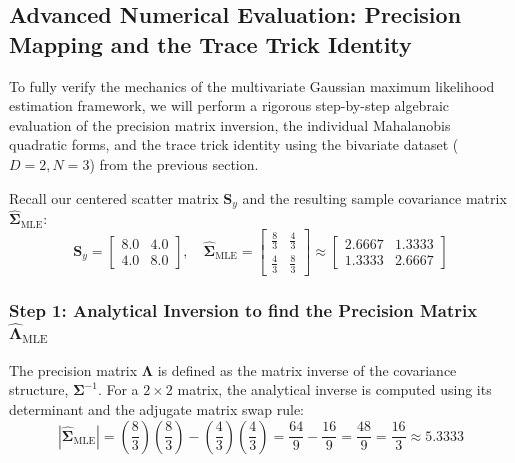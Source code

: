 \documentclass{article}
\begin{document}
\subsection{Advanced Numerical Evaluation: Precision Mapping and the Trace Trick Identity}

To fully verify the mechanics of the multivariate Gaussian maximum likelihood estimation framework, we will perform a rigorous step-by-step algebraic evaluation of the precision matrix inversion, the individual Mahalanobis quadratic forms, and the trace trick identity using the bivariate dataset ($D = 2, N = 3$) from the previous section.

Recall our centered scatter matrix $\mathbf{S}_y$ and the resulting sample covariance matrix $\hat{\boldsymbol{\Sigma}}_{\text{MLE}}$:
\begin{equation}
\mathbf{S}_y = \begin{bmatrix} 8.0 & 4.0 \\ 4.0 & 8.0 \end{bmatrix}, \quad \hat{\boldsymbol{\Sigma}}_{\text{MLE}} = \begin{bmatrix} \frac{8}{3} & \frac{4}{3} \\ \frac{4}{3} & \frac{8}{3} \end{bmatrix} \approx \begin{bmatrix} 2.6667 & 1.3333 \\ 1.3333 & 2.6667 \end{bmatrix}
\end{equation}

\subsubsection{Step 1: Analytical Inversion to find the Precision Matrix $\hat{\boldsymbol{\Lambda}}_{\text{MLE}}$}

The precision matrix $\boldsymbol{\Lambda}$ is defined as the matrix inverse of the covariance structure, $\boldsymbol{\Sigma}^{-1}$. For a $2 \times 2$ matrix, the analytical inverse is computed using its determinant and the adjugate matrix swap rule:
\begin{equation}
|\hat{\boldsymbol{\Sigma}}_{\text{MLE}}| = \left(\frac{8}{3}\right)\left(\frac{8}{3}\right) - \left(\frac{4}{3}\right)\left(\frac{4}{3}\right) = \frac{64}{9} - \frac{16}{9} = \frac{48}{9} = \frac{16}{3} \approx \mathbf{5.3333}
\end{equation}
\end{document}
